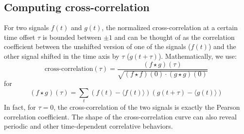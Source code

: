 \documentclass[11pt]{article}
\begin{document}
\subsection{Computing cross-correlation} \label{sec:supp:cross_correlation}
For two signals \(f(t)\) and \(g(t)\), the normalized cross-correlation at a certain time offset \(\tau\) is bounded between \(\pm1\) and can be thought of as the correlation coefficient between the unshifted version of one of the signals (\(f(t)\)) and the other signal shifted in the time axis by \(\tau\) (\(g(t + \tau)\)). Mathematically, we use:
\begin{equation}
\text{cross-correlation}(\tau) = \frac{(f \star g)(\tau)}{\sqrt{(f \star f)(0) \cdot (g \star g)(0)}}
\end{equation}
for
\begin{equation}
    (f \star g)(\tau) = \sum_t (f(t) - \langle f(t)\rangle)(g(t+\tau) - \langle g(t)\rangle)
\end{equation}
In fact, for \(\tau = 0\), the cross-correlation of the two signals is exactly the Pearson correlation coefficient. The shape of the cross-correlation curve can also reveal periodic and other time-dependent correlative behaviors.
\end{document}
